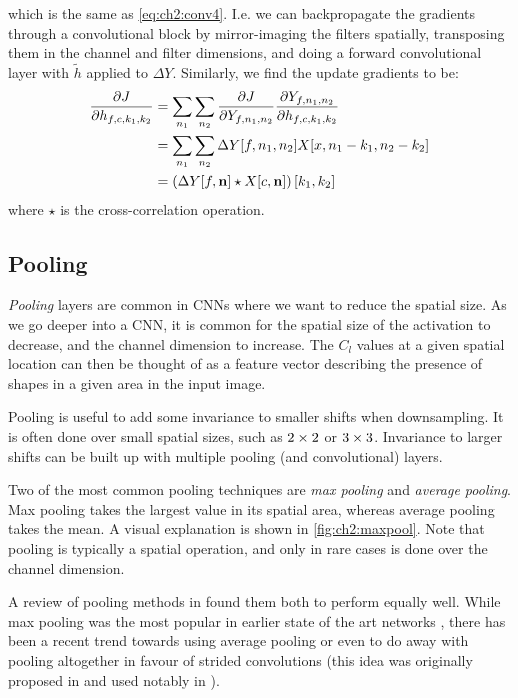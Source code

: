 which is the same as \eqref{eq:ch2:conv4}. I.e. we can backpropagate the
gradients through a convolutional block by mirror-imaging the filters spatially,
transposing them in the channel and filter dimensions, and doing a forward
convolutional layer with $\tilde{h}$ applied to $\Delta Y$. Similarly, we 
find the update gradients to be:
\begin{align}
  \frac{\partial J}{\partial h_{f,c,k_1,k_2}} &= \sum_{n_1} \sum_{n_2} \frac{\partial J}{\partial Y_{f, n_1, n_2}} \frac{\partial Y_{f, n_1, n_2}}{\partial h_{f, c, k_1, k_2}} \\
                            &= \sum_{n_1} \sum_{n_2} \Delta Y[f, n_1, n_2] X[x, n_1-k_1, n_2-k_2 ] \\
                            &= \left(\Delta Y[f, \mathbf{n}] \star X[c, \mathbf{n}]\right)[k_1, k_2]
\end{align}
where $\star$ is the cross-correlation operation. 


\subsection{Pooling}
\emph{Pooling} layers are common in CNNs where we want to reduce the spatial size. As
we go deeper into a CNN, it is common for the spatial size of the activation to
decrease, and the channel dimension to increase. The $C_l$ values at a given
spatial location can then be thought of as a feature vector describing the
presence of shapes in a given area in the input image.

Pooling is useful to add some invariance to smaller shifts when downsampling. It
is often done over small spatial sizes, such as $2\times 2$ or $3\times 3$. Invariance
to larger shifts can be built up with multiple pooling (and convolutional) layers.

Two of the most common pooling techniques are \emph{max pooling} and
\emph{average pooling}. Max pooling takes the largest value in its spatial area,
whereas average pooling takes the mean. A visual explanation is shown in 
\autoref{fig:ch2:maxpool}. Note that pooling is typically a spatial operation,
and only in rare cases is done over the channel dimension.

A review of pooling methods in \cite{mishkin_systematic_2016} found them both
to perform equally well. While max pooling was the most popular in earlier state
of the art networks \cite{krizhevsky_imagenet_2012, simonyan_very_2014},
there has been a recent trend towards using average pooling \cite{huang_densely_2017}
or even to do away with pooling altogether in favour of strided convolutions
(this idea was originally proposed in \cite{springenberg_striving_2014-3} and
used notably in \cite{he_deep_2016, xie_aggregated_2017,
zagoruyko_wide_2016-1}).
  
